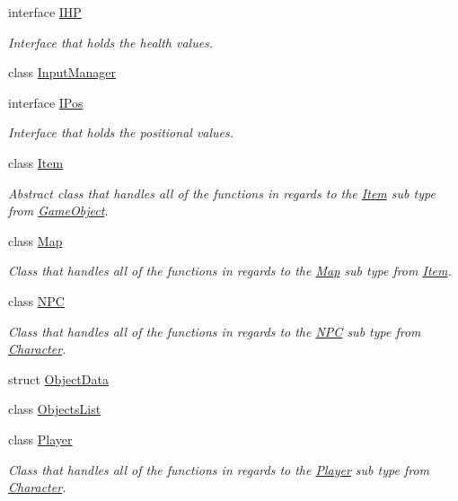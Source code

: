 \begin{DoxyCompactItemize}
interface \mbox{\hyperlink{interface_roguelike_r_p_g_1_1_i_h_p}{I\+HP}}
\begin{DoxyCompactList}\small\item\em Interface that holds the health values. \end{DoxyCompactList}\item 
class \mbox{\hyperlink{class_roguelike_r_p_g_1_1_input_manager}{Input\+Manager}}
\item 
interface \mbox{\hyperlink{interface_roguelike_r_p_g_1_1_i_pos}{I\+Pos}}
\begin{DoxyCompactList}\small\item\em Interface that holds the positional values. \end{DoxyCompactList}\item 
class \mbox{\hyperlink{class_roguelike_r_p_g_1_1_item}{Item}}
\begin{DoxyCompactList}\small\item\em Abstract class that handles all of the functions in regards to the \mbox{\hyperlink{class_roguelike_r_p_g_1_1_item}{Item}} sub type from \mbox{\hyperlink{class_roguelike_r_p_g_1_1_game_object}{Game\+Object}}. \end{DoxyCompactList}\item 
class \mbox{\hyperlink{class_roguelike_r_p_g_1_1_map}{Map}}
\begin{DoxyCompactList}\small\item\em Class that handles all of the functions in regards to the \mbox{\hyperlink{class_roguelike_r_p_g_1_1_map}{Map}} sub type from \mbox{\hyperlink{class_roguelike_r_p_g_1_1_item}{Item}}. \end{DoxyCompactList}\item 
class \mbox{\hyperlink{class_roguelike_r_p_g_1_1_n_p_c}{N\+PC}}
\begin{DoxyCompactList}\small\item\em Class that handles all of the functions in regards to the \mbox{\hyperlink{class_roguelike_r_p_g_1_1_n_p_c}{N\+PC}} sub type from \mbox{\hyperlink{class_roguelike_r_p_g_1_1_character}{Character}}. \end{DoxyCompactList}\item 
struct \mbox{\hyperlink{struct_roguelike_r_p_g_1_1_object_data}{Object\+Data}}
\item 
class \mbox{\hyperlink{class_roguelike_r_p_g_1_1_objects_list}{Objects\+List}}
\item 
class \mbox{\hyperlink{class_roguelike_r_p_g_1_1_player}{Player}}
\begin{DoxyCompactList}\small\item\em Class that handles all of the functions in regards to the \mbox{\hyperlink{class_roguelike_r_p_g_1_1_player}{Player}} sub type from \mbox{\hyperlink{class_roguelike_r_p_g_1_1_character}{Character}}. \end{DoxyCompactList}\item 

\end{DoxyCompactItemize}
